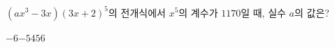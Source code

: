 $(ax^3-3x)(3x+2)^5$의 전개식에서 $x^5$의 계수가 $1170$일 때, 실수 $a$의 값은?
\begin{choices32}{$-6$}{$-5$}{$4$}{$5$}{$6$}\end{choices32}
